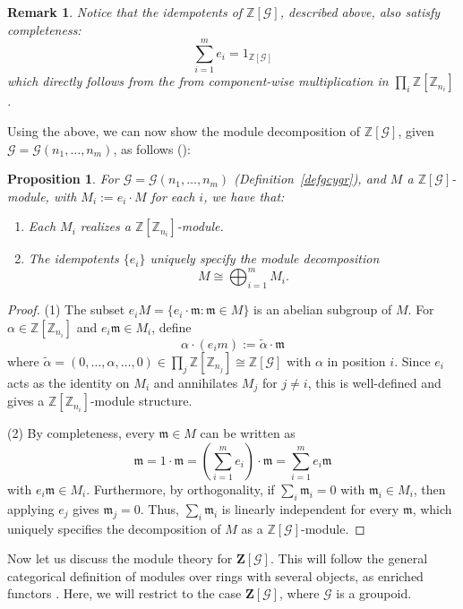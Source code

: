 \documentclass[a4paper,12pt]{article}
\newtheorem{proposition}{Proposition}[section]
\newtheorem{remark}{Remark}[section]
\newcommand{\Z}{\mathbb{Z}}
\newcommand{\Zb}{\mathbf{Z}}
\newcommand{\calG}{\mathcal{G}}
\newcommand{\m}{\mathfrak{m}}
\begin{document}
\begin{remark}
Notice that the idempotents of $\Z[\calG]$, described above, also satisfy completeness:
  $$\sum_{i=1}^{m} e_i = 1_{\Z[\calG]}$$  
which directly follows from the from component-wise multiplication in
$\prod_i \Z[\Z_{n_i}]$.
\end{remark}

Using the above, we can now show the module decomposition of $\Z[\calG]$, given $\calG = \calG(n_1, \ldots, n_m)$, as follows (\cite{nastasescu2004methods}): 
  
\begin{proposition}    
\label{prop-id}  
For  $\calG = \calG(n_1, \ldots, n_m)$ (Definition~\ref{defgcygr}), and  $M$  a $\Z[\calG]$-module, with   $M_i := e_i \cdot M$ for each  $i$, we have that:  
\begin{enumerate} 
  \item Each $M_i$ realizes a $\Z[\Z_{n_i}]$-module.
  \item The idempotents $\{ e_i \}$ uniquely specify the module decomposition  
        \[
          M \cong \bigoplus_{i=1}^{m} M_i.
        \]         
\end{enumerate}
\end{proposition}
\begin{proof}
(1) The subset $e_i M = \{e_i \cdot \m: \m\in M\}$ is an abelian
subgroup of $M$. For $\alpha \in \Z[\Z_{n_i}]$ and $e_i \m\in M_i$,
define
\[
  \alpha \cdot (e_i m) := \tilde{\alpha} \cdot \m 
\]
where $\tilde{\alpha} = (0, \ldots, \alpha, \ldots, 0) \in
\prod_j \Z[\Z_{n_j}] \cong \Z[\calG]$ with $\alpha$ in position $i$.
Since $e_i$ acts as the identity on $M_i$ and annihilates $M_j$ for
$j \neq i$, this is well-defined and gives a $\Z[\Z_{n_i}]$-module
structure.

(2) By completeness, every $\m \in M$ can be written as
\[
  \m = 1 \cdot \m= \left(\sum_{i=1}^{m} e_i\right) \cdot \m
  = \sum_{i=1}^{m} e_i \m
\]
with $e_i \m \in M_i$. Furthermore, by orthogonality, if $\sum_i \m_i = 0$ with
$\m_i \in M_i$, then applying $e_j$ gives $\m_j = 0$. Thus, $\sum_i \m_i$ is linearly independent for every $\m$, which uniquely specifies the   decomposition of $M$ as a $\Z[\calG]$-module.    
\end{proof}



Now let us discuss the module theory for $\Zb[\calG]$. This will follow the  general categorical definition of modules over rings with several objects, as     enriched functors  \cite{Mitchell1972, mitchell1985, Kelly1982,   mitchener2014}.  Here, we will restrict to the case $\Zb[\calG]$, where $\calG$ is a groupoid.   
\end{document}
